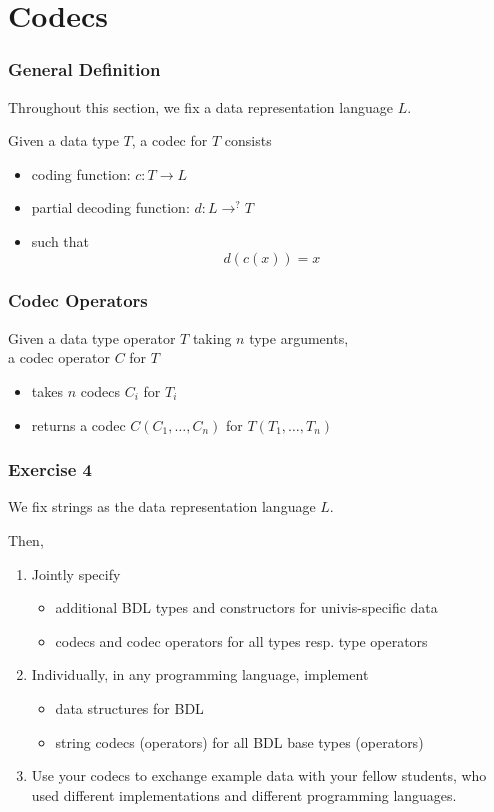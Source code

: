 \section{Codecs}

\begin{frame}\frametitle{General Definition}
Throughout this section, we fix a data representation language $L$.

Given a data type $T$, a codec for $T$ consists
\begin{itemize}
 \item coding function: $c:T \to L$
 \item partial decoding function: $d:L\to^? T$
 \item such that
  \[d(c(x))=x\]
\end{itemize}
\end{frame}

\begin{frame}\frametitle{Codec Operators}
Given a data type operator $T$ taking $n$ type arguments,\\
a codec operator $C$ for $T$
\begin{itemize}
 \item takes $n$ codecs $C_i$ for $T_i$
 \item returns a codec $C(C_1,\ldots,C_n)$ for $T(T_1,\ldots,T_n)$
\end{itemize}
\end{frame}

\begin{frame}\frametitle{Exercise 4}
We fix strings as the data representation language $L$.

Then, 
\begin{enumerate}
 \item Jointly specify
  \begin{itemize}
  \item additional BDL types and constructors for univis-specific data
  \item codecs and codec operators for all types resp. type operators
  \end{itemize}
 \item Individually, in any programming language, implement
  \begin{itemize}
   \item data structures for BDL
   \item string codecs (operators) for all BDL base types (operators)
  \end{itemize}
 \item Use your codecs to exchange example data with your fellow students, who used different implementations and different programming languages.
\end{enumerate}
\end{frame}


